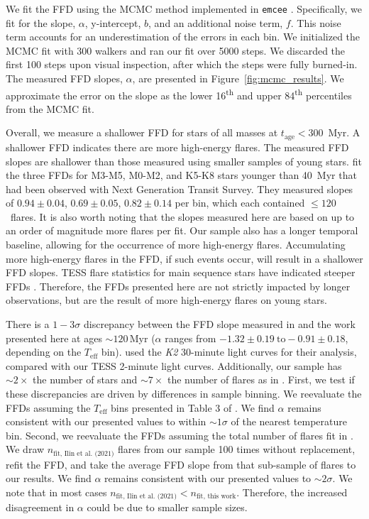 \documentclass[twocolumn]{aastex631}
\begin{document}
We fit the FFD using the MCMC method implemented in \texttt{emcee} \citep{goodman10, emcee}.
Specifically, we fit for the slope, $\alpha$, y-intercept, $b$, and an additional
noise term, $f$. This noise term  accounts for an underestimation of the errors in
each bin. We initialized the MCMC fit with 300 walkers and ran our fit over 5000
steps.  We discarded the first 100 steps upon visual inspection, after which the
steps were fully burned-in. The measured FFD slopes, $\alpha$, are presented in
Figure~\ref{fig:mcmc_results}. We approximate the error on the slope as the lower
16\textsuperscript{th} and upper 84\textsuperscript{th} percentiles from the MCMC fit.

Overall, we measure a shallower FFD for stars of all masses at $t_\textrm{age} < 300$~Myr.
A shallower FFD indicates there are more high-energy flares. The measured FFD slopes
are shallower than those measured using smaller samples of young stars. \cite{jackman21}
fit the three FFDs for M3-M5, M0-M2, and K5-K8 stars younger than 40~Myr that had been
observed with Next Generation Transit Survey. They measured slopes of $0.94 \pm 0.04$,
$0.69 \pm 0.05$, $0.82 \pm 0.14$ per bin, which each contained $\leq 120$~flares.
It is also worth noting that the slopes measured here are based on up to an order of
magnitude more flares per fit. Our sample also has a longer temporal baseline,
allowing for the occurrence of more high-energy flares. Accumulating more high-energy
flares in the FFD, if such events occur, will result in a shallower FFD slopes. TESS
flare statistics for main sequence stars have indicated steeper FFDs \citep{feinstein22_criticality}.
Therefore, the FFDs presented here are not strictly impacted by longer observations,
but are the result of more high-energy flares on young stars.


There is a $1-3\sigma$ discrepancy between the FFD slope measured in \cite{ilin21}
and the work presented here at ages $\sim 120$\,Myr ($\alpha$ ranges from
$-1.32 \pm 0.19 ~\textrm{to} -0.91 \pm 0.18$, depending on the $T_\textrm{eff}$ bin).
\cite{ilin21} used the \textit{K2} 30-minute light curves for their analysis, compared
with our TESS 2-minute light curves. Additionally, our sample has $\sim 2 \times$
the number of stars and $\sim 7 \times$ the number of flares as in \cite{ilin21}.
First, we test if these discrepancies are driven by differences in sample binning.
We reevaluate the FFDs assuming the $T_\textrm{eff}$ bins presented in Table 3 of
\cite{ilin21}. We find $\alpha$ remains consistent with our presented values to
within $\sim 1\sigma$ of the nearest temperature bin. Second, we reevaluate the
FFDs assuming the total number of flares fit in \cite{ilin21}. We draw
$n_\textrm{fit, Ilin et al. (2021)}$ \citep[last column in Table 3 of ][]{ilin21}
flares from our sample 100 times without replacement, refit the FFD, and take
the average FFD slope from that sub-sample of flares to our results.  We find
$\alpha$ remains consistent with our presented values to $\sim 2\sigma$. We note
that in most cases $n_\textrm{fit, Ilin et al. (2021)} < n_\textrm{fit, this work}$.
Therefore, the increased disagreement in $\alpha$ could be due to smaller sample sizes.
\end{document}
